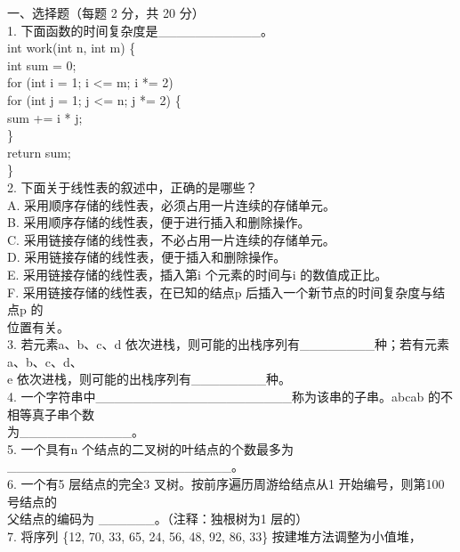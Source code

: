 
\begin{question}
一、选择题（每题 2 分，共 20 分）\\
1. 下面函数的时间复杂度是\_\_\_\_\_\_\_\_\_\_\_。\\
int work(int n, int m) \{\\
int sum = 0;\\
for (int i = 1; i <= m; i *= 2)\\
for (int j = 1; j <= n; j *= 2) \{\\
sum += i * j;\\
\}\\
return sum;\\
\}\\
2. 下面关于线性表的叙述中，正确的是哪些？\\
A. 采用顺序存储的线性表，必须占用一片连续的存储单元。\\
B. 采用顺序存储的线性表，便于进行插入和删除操作。\\
C. 采用链接存储的线性表，不必占用一片连续的存储单元。\\
D. 采用链接存储的线性表，便于插入和删除操作。\\
E. 采用链接存储的线性表，插入第i 个元素的时间与i 的数值成正比。\\
F. 采用链接存储的线性表，在已知的结点p 后插入一个新节点的时间复杂度与结点p 的\\
位置有关。\\
3. 若元素a、b、c、d 依次进栈，则可能的出栈序列有\_\_\_\_\_\_\_\_种；若有元素a、b、c、d、\\
e 依次进栈，则可能的出栈序列有\_\_\_\_\_\_\_\_种。\\
4. 一个字符串中\_\_\_\_\_\_\_\_\_\_\_\_\_\_\_\_\_\_\_\_\_称为该串的子串。abcab 的不相等真子串个数\\
为\_\_\_\_\_\_\_\_\_\_\_\_。\\
5. 一个具有n 个结点的二叉树的叶结点的个数最多为\_\_\_\_\_\_\_\_\_\_\_\_\_\_\_\_\_\_\_\_\_\_\_\_。\\
6. 一个有5 层结点的完全3 叉树。按前序遍历周游给结点从1 开始编号，则第100 号结点的\\
父结点的编码为 \_\_\_\_\_\_。（注释：独根树为1 层的）\\
7. 将序列 \{12, 70, 33, 65, 24, 56, 48, 92, 86, 33\} 按建堆方法调整为小值堆，\\

\end{question}
